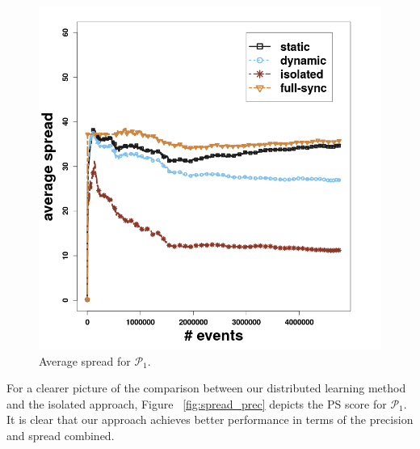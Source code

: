 \begin{center}
	
	\begin{figure}[H]
		\centering
		\includegraphics[width=\textwidth,height=.65\textheight]{chapters/figures/synopses/p1_spread_100_2_08.png}
		
		\caption{Average spread for $\mathcal{P}_1$.}
		\label{fig:spread}
	\end{figure}
\end{center}


\par For a clearer picture of the comparison between our distributed learning method and the isolated approach, Figure ~\ref{fig:spread_prec} depicts the PS score for $\mathcal{P}_1$. It is clear that our approach achieves better performance in terms of the precision and spread combined.  

